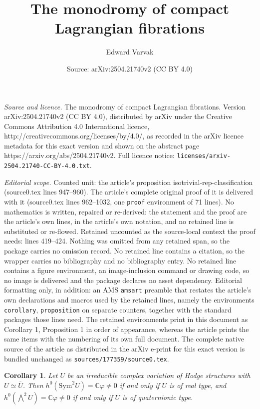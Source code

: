 \documentclass[10pt,a4paper]{amsart}
\title{The monodromy of compact Lagrangian fibrations}
\author{Edward Varvak}
\date{Source: arXiv:2504.21740v2 (CC BY 4.0)}
\newtheorem{corollary}{Corollary}
\newcommand{\C}{\mathbb{C}}
\begin{document}
\maketitle

\noindent\emph{Source and licence.} The monodromy of compact Lagrangian fibrations. Version arXiv:2504.21740v2 (CC BY 4.0), distributed by arXiv under the Creative Commons Attribution 4.0 International licence, http://creativecommons.org/licenses/by/4.0/, as recorded in the arXiv licence metadata for this exact version and shown on the abstract page https://arxiv.org/abs/2504.21740v2. Full licence notice: \texttt{licenses/arxiv-2504.21740-CC-BY-4.0.txt}.\par\smallskip

\noindent\textit{Editorial scope.} Counted unit: the article's proposition isotrivial-rep-classification (source0.tex lines 947--960). The article's complete original proof of it is delivered with it (source0.tex lines 962--1032, one \texttt{proof} environment of 71 lines). No mathematics is written, repaired or re-derived: the statement and the proof are the article's own lines, in the article's own notation, and no retained line is substituted or re-flowed.  Retained uncounted as the source-local context the proof needs: lines 419--424.  Nothing was omitted from any retained span, so the package carries no omission record.  No retained line contains a citation, so the wrapper carries no bibliography and no bibliography entry.  No retained line contains a figure environment, an image-inclusion command or drawing code, so no image is delivered and the package declares no asset dependency.  Editorial formatting only, in addition: an AMS \texttt{amsart} preamble that restates the article's own declarations and macros used by the retained lines, namely the environments \texttt{corollary}, \texttt{proposition} on separate counters, together with the standard packages those lines need.  The retained environments print in this document as Corollary 1, Proposition 1 in order of appearance, whereas the article prints the same items with the numbering of its own full document.  The complete native source of the article as distributed in the arXiv e-print for this exact version is bundled unchanged as \texttt{sources/177359/source0.tex}.
\begin{corollary}\label{proof-of-rep-classification}
    Let \(U\) be an irreducible complex variation of Hodge structures with 
    \(U \simeq \overline{U}\). Then \(h^0(\mathrm{Sym}^2 U) = \C\varphi \neq 0\) 
    if and only if \(U\) is of real type, and \(h^0(\bigwedge^2 U) = \C \varphi \neq 0\)
    if and only if \(U\) is of quaternionic type.
\end{corollary}
\end{document}
